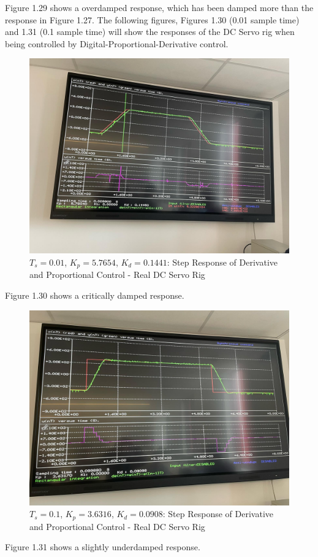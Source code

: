 \documentclass[stu, a4paper, 12pt, floatsintext]{apa7}
\numberwithin{figure}{section}
\numberwithin{table}{section}
\numberwithin{equation}{section}
\begin{document}
Figure 1.29 shows a overdamped response, which has been damped more than the response in Figure 1.27.
The following figures, Figures 1.30 (0.01 sample time) and 1.31 (0.1 sample time) will show the responses of the DC Servo rig when being controlled by Digital-Proportional-Derivative control. 
\begin{figure}[H]
    \caption{$T_s = 0.01$, $K_p = 5.7654$, $K_d = 0.1441$: Step Response of Derivative and Proportional Control - Real DC Servo Rig}
    \label{fig:0.01_Ts_step4_step_response_1_PD}
    \centering
    \includegraphics[width=1.1\textwidth]{pictures/task4_kp_kd_1.jpg}
\end{figure}
Figure 1.30 shows a critically damped response.
\begin{figure}[H]
    \caption{$T_s = 0.1$, $K_p = 3.6316$, $K_d = 0.0908$: Step Response of Derivative and Proportional Control - Real DC Servo Rig}
    \label{fig:0.01_Ts_step4_step_response_2_PD}
    \centering
    \includegraphics[width=1.1\textwidth]{pictures/task4_kp_kd_2.jpg}
\end{figure}
Figure 1.31 shows a slightly underdamped response.
\end{document}
